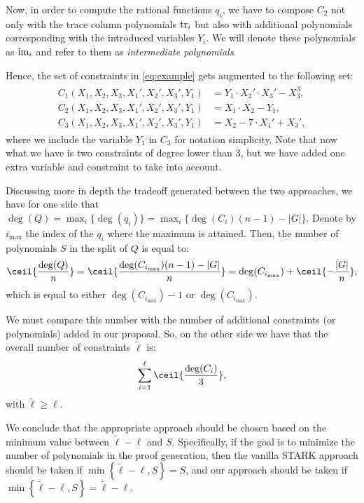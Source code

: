 Now, in order to compute the rational functions $q_i$, we have to compose $C_2$ not only with the trace column polynomials $\text{tr}_i$ but also with additional polynomials corresponding with the introduced variables $Y_i$. We will denote these polynomials as $\text{im}_i$ and refer to them as \textit{intermediate polynomials}.

Hence, the set of constraints in \eqref{eq:example} gets augmented to the following set:
\begin{align*}
\begin{split}
  C_1(X_1,X_2,X_3,X_1',X_2',X_3',Y_1) &= Y_1 \cdot X_2' \cdot X_3' - X_3^3, \\[0.2cm]
  C_2(X_1,X_2,X_3,X_1',X_2',X_3',Y_1) &= X_1 \cdot X_2 - Y_1, \\[0.2cm]
  C_3(X_1,X_2,X_3,X_1',X_2',X_3',Y_1) &= X_2 -7 \cdot X_1' + X_3',
\end{split}
\end{align*}
where we include the variable $Y_1$ in $C_3$ for notation simplicity. Note that now what we have is two constraints of degree lower than $3$, but we have added one extra variable and constraint to take into account.

Discussing more in depth the tradeoff generated between the two approaches, we have for one side that $\deg(Q) = \max_i\{\deg(q_i)\} = \max_i\{\deg(C_i)(n-1)-|G|\}$. Denote by $i_{\text{max}}$ the index of the $q_i$ where the maximum is attained. Then, the number of polynomials $S$ in the split of $Q$ is equal to:
\[
\ceil{\frac{\deg(Q)}{n}} = \ceil{\frac{\deg(C_{i_{\text{max}}})(n-1)-|G|}{n}} = \deg(C_{i_{\text{max}}}) + \ceil{-\frac{|G|}{n}},
\]
which is equal to either $\deg(C_{i_{\text{max}}})-1$ or $\deg(C_{i_{\text{max}}})$.

We must compare this number with the number of additional constraints (or polynomials) added in our proposal. So, on the other side we have that the overall number of constraints $\tilde{\ell}$ is:
\[
\sum_{i=1}^{\ell} \ceil{\frac{\deg(C_i)}{3}},
\]
with $\tilde{\ell} \geq \ell$.

We conclude that the appropriate approach should be chosen based on the minimum value between $\tilde{\ell}-\ell$ and $S$. Specifically, if the goal is to minimize the number of polynomials in the proof generation, then the vanilla STARK approach should be taken if $\min\left\{\tilde{\ell}-\ell,S\right\} = S$, and our approach should be taken if $\min\left\{\tilde{\ell}-\ell,S\right\} = \tilde{\ell}-\ell$.

